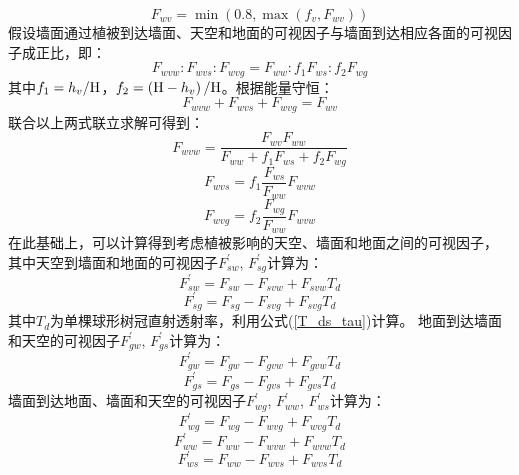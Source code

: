 \begin{equation}
F_{wv} = \min (0.8, \max (f_v, F_{wv}))
\end{equation}
假设墙面通过植被到达墙面、天空和地面的可视因子与墙面到达相应各面的可视因子成正比，即：
\begin{equation}
F_{wvw}: F_{wvs}: F_{wvg}=F_{ww}: f_{1} F_{ws}: f_{2} F_{w g}
\end{equation}
其中$f_1=h_v/{\rm H}$，$f_2=\left({\rm H}-h_v\right)/{\rm H}$。根据能量守恒：
\begin{equation}
F_{wvw}+F_{wvs}+F_{wvg}=F_{w v}
\end{equation}
联合以上两式联立求解可得到：
\begin{equation}
F_{wvw}=\frac{F_{w v} F_{ww}}{F_{ww}+f_{1} F_{ws}+f_{2} F_{w g}}
\end{equation}
\begin{equation}
F_{wvs}=f_{1} \frac{F_{ws}}{F_{ww}} F_{wvw}
\end{equation}
\begin{equation}
F_{wvg}=f_{2} \frac{F_{w g}}{F_{ww}} F_{wvw}
\end{equation}
在此基础上，可以计算得到考虑植被影响的天空、墙面和地面之间的可视因子，
其中天空到墙面和地面的可视因子$F_{sw}^\prime$, $F_{sg}^\prime$计算为：
\begin{equation}
F_{sw}^{\prime}=F_{sw}-F_{svw}+F_{svw} T_{d}
\end{equation}
\begin{equation}
F_{sg}^{\prime}=F_{sg}-F_{svg}+F_{svg} T_{d}
\end{equation}
其中$T_d$为单棵球形树冠直射透射率，利用公式(\ref{T_ds_tau})计算。
地面到达墙面和天空的可视因子$F_{gw}^\prime$, $F_{gs}^\prime$计算为：
\begin{equation}
F_{gw}^{\prime}=F_{gw}-F_{gvw}+F_{gvw} T_{d}
\end{equation}
\begin{equation}
F_{gs}^{\prime}=F_{gs}-F_{gvs}+F_{gvs} T_{d}
\end{equation}
墙面到达地面、墙面和天空的可视因子$F_{wg}^\prime$, $F_{ww}^\prime$, $F_{ws}^\prime$计算为：
\begin{equation}
F_{wg}^{\prime}=F_{wg}-F_{wvg}+F_{wvg} T_{d}
\end{equation}
\begin{equation}
F_{ww}^{\prime}=F_{ww}-F_{wvw}+F_{wvw} T_{d}
\end{equation}
\begin{equation}
F_{ws}^{\prime}=F_{ww}-F_{wvs}+F_{wvs} T_{d}
\end{equation}


